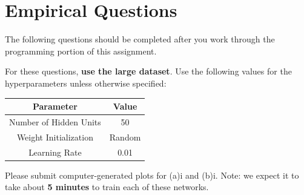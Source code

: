 \documentclass[11pt,addpoints,answers]{exam}
\begin{document}
\begin{questions}

\end{questions}

\clearpage
\newpage

\clearpage
\section{Empirical Questions}
\label{sec:interp}

The following questions should be completed after you work through the programming portion of this assignment.

For these questions, \textbf{use the large dataset}. Use the following values for the hyperparameters unless otherwise specified:

\begin{center}
    \begin{tabular}{|c|c|}
        \hline
        \textbf{Parameter} & \textbf{Value} \\
        \hline
        Number of Hidden Units & 50 \\
        \hline
        Weight Initialization & {\sc Random} \\
        \hline
        Learning Rate & 0.01 \\
        \hline
    \end{tabular}
\end{center}


Please submit computer-generated plots for (a)i and (b)i. Note: we expect it to take about \textbf{5 minutes} to train each of these networks.
\end{document}
